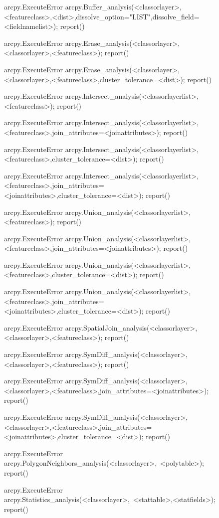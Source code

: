 \begin{figure}
{\begin{code}
{arcpy.ExecuteError} arcpy.Buffer\_analysis(<classorlayer>,<featureclass>,<dist>,dissolve\_option="LIST",dissolve\_field=<fieldnamelist>); report()

{arcpy.ExecuteError} arcpy.Erase\_analysis(<classorlayer>,<classorlayer>,<featureclass>); report()

{arcpy.ExecuteError} arcpy.Erase\_analysis(<classorlayer>,<classorlayer>,<featureclass>,cluster\_tolerance=<dist>); report()

{arcpy.ExecuteError} arcpy.Intersect\_analysis(<classorlayerlist>,<featureclass>); report()

{arcpy.ExecuteError} arcpy.Intersect\_analysis(<classorlayerlist>,<featureclass>,join\_attributes=<joinattributes>); report()

{arcpy.ExecuteError} arcpy.Intersect\_analysis(<classorlayerlist>,<featureclass>,cluster\_tolerance=<dist>); report()

{arcpy.ExecuteError} arcpy.Intersect\_analysis(<classorlayerlist>,<featureclass>,join\_attributes=<joinattributes>,cluster\_tolerance=<dist>); report()

{arcpy.ExecuteError} arcpy.Union\_analysis(<classorlayerlist>,<featureclass>); report()

{arcpy.ExecuteError} arcpy.Union\_analysis(<classorlayerlist>,<featureclass>,join\_attributes=<joinattributes>); report()

{arcpy.ExecuteError} arcpy.Union\_analysis(<classorlayerlist>,<featureclass>,cluster\_tolerance=<dist>); report()

{arcpy.ExecuteError} arcpy.Union\_analysis(<classorlayerlist>,<featureclass>,join\_attributes=<joinattributes>,cluster\_tolerance=<dist>); report()

{arcpy.ExecuteError} arcpy.SpatialJoin\_analysis(<classorlayer>,<classorlayer>,<featureclass>); report()

{arcpy.ExecuteError} arcpy.SymDiff\_analysis(<classorlayer>,<classorlayer>,<featureclass>); report()

{arcpy.ExecuteError} arcpy.SymDiff\_analysis(<classorlayer>,<classorlayer>,<featureclass>,join\_attributes=<joinattributes>); report()

{arcpy.ExecuteError} arcpy.SymDiff\_analysis(<classorlayer>,<classorlayer>,<featureclass>,join\_attributes=<joinattributes>,cluster\_tolerance=<dist>); report()

{arcpy.ExecuteError} arcpy.PolygonNeighbors\_analysis(<classorlayer>,~<polytable>); report()

{arcpy.ExecuteError} arcpy.Statistics\_analysis(<classorlayer>,~<stattable>,<statfields>); report()


\end{code}}
\end{figure}
